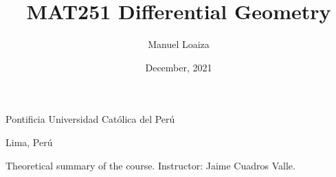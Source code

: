 \title{MAT251 Differential Geometry}
\author{Manuel Loaiza}
\date{December, 2021}



\maketitle

\vspace*{-0.25in}
\centerline{Pontificia Universidad Cat\'olica del Per\'u}
\centerline{Lima, Per\'u}
\centerline{}
\vspace*{0.15in}

\begin{framed}
    Theoretical summary of the course.
    Instructor: Jaime Cuadros Valle.
\end{framed}

\tableofcontents

\newpage
























